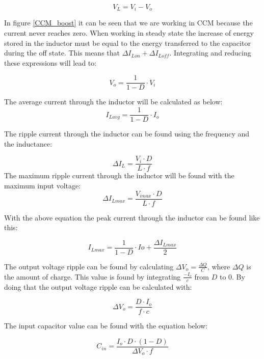 \begin{equation}
V_L = V_i-V_o
\end{equation}

In figure \ref{CCM_boost} it can be seen that we are working in CCM because the current never reaches zero. 
When working in steady state the increase of energy stored in the inductor must be equal to the energy transferred to the capacitor during the off state. This means that $\Delta I_{Lon}+\Delta I_{Loff}$. Integrating and reducing these expressions will lead to:

\begin{equation}
V_o = \frac{1}{1-D}\cdot V_i
\end{equation}
 
The average current through the inductor will be calculated as below:
\begin{equation}
I_{Lavg} = \frac{1}{1-D}\cdot I_o
\end{equation}

The ripple current through the inductor can be found using the frequency and the inductance:

\begin{equation}\label{boostind}
\Delta I_L = \frac{V_i\cdot D}{L\cdot f}
\end{equation}
The maximum ripple current through the inductor will be found with the maximum input voltage:
\begin{equation}
\Delta I_{Lmax} = \frac{V_{imax}\cdot D}{L\cdot f}
\end{equation}

With the above equation the peak current through the inductor can be found like this:

\begin{equation}
I_{Lmax} = \frac{1}{1-D}\cdot Io+\frac{\Delta I_{Lmax}}{2}
\end{equation}

 The output voltage ripple can be found by calculating $\Delta V_o = \frac{\Delta Q}{C}$, where $\Delta Q$ is the amount of charge. This value is found by integrating $\frac{-I_o}{c}$ from $D$ to $0$. By doing that the output voltage ripple can be calculated with:

\begin{equation}\label{boostc}
\Delta V_o = \frac{D\cdot I_o}{f\cdot c}
\end{equation}

The input capacitor value can be found with the equation below:

\begin{equation}
\label{boostcin}
C_{in} = \frac{I_o\cdot D\cdot (1-D)}{\Delta V_o\cdot f}
\end{equation}  
